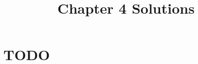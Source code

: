 \documentclass[12pt]{article}
\title{Chapter 4 Solutions}
\begin{document}
\section{TODO}
\end{document}
